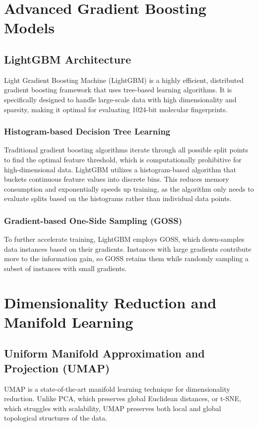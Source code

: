 \section{Advanced Gradient Boosting Models}

\subsection{LightGBM Architecture}
Light Gradient Boosting Machine (LightGBM) is a highly efficient, distributed gradient boosting framework that uses tree-based learning algorithms. It is specifically designed to handle large-scale data with high dimensionality and sparsity, making it optimal for evaluating 1024-bit molecular fingerprints.

\subsubsection{Histogram-based Decision Tree Learning}
Traditional gradient boosting algorithms iterate through all possible split points to find the optimal feature threshold, which is computationally prohibitive for high-dimensional data. LightGBM utilizes a histogram-based algorithm that buckets continuous feature values into discrete bins. This reduces memory consumption and exponentially speeds up training, as the algorithm only needs to evaluate splits based on the histograms rather than individual data points.

\subsubsection{Gradient-based One-Side Sampling (GOSS)}
To further accelerate training, LightGBM employs GOSS, which down-samples data instances based on their gradients. Instances with large gradients contribute more to the information gain, so GOSS retains them while randomly sampling a subset of instances with small gradients.

\section{Dimensionality Reduction and Manifold Learning}

\subsection{Uniform Manifold Approximation and Projection (UMAP)}
UMAP is a state-of-the-art manifold learning technique for dimensionality reduction. Unlike PCA, which preserves global Euclidean distances, or t-SNE, which struggles with scalability, UMAP preserves both local and global topological structures of the data.

